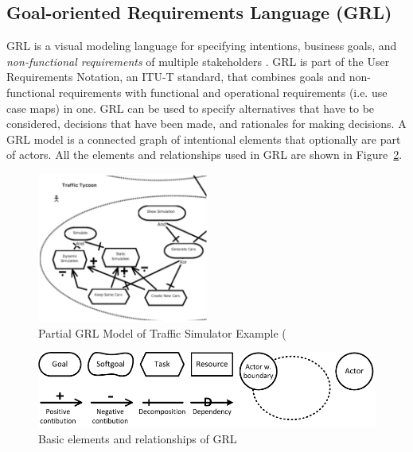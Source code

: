 \subsection{Goal-oriented Requirements Language (GRL)}
\label{sect:background:grl}
GRL is a visual modeling language for specifying intentions, business goals, and \emph{non-functional requirements} of multiple stakeholders \cite{Amyot:2010:EGM:1841349.1841356}. GRL is part of the User Requirements Notation, an ITU-T standard, that combines goals and non-functional requirements with functional and operational requirements (i.e. use case maps) in one. GRL can be used to specify alternatives that have to be considered, decisions that have been made, and rationales for making decisions. A GRL model is a connected graph of intentional elements that optionally are part of actors. All the elements and relationships used in GRL are shown in Figure~\ref{fig:grl_legend}.

\begin{figure}[ht]
\centering
\includegraphics[width=0.5\textwidth]{img/example_small}
\caption{Partial GRL Model of Traffic Simulator Example (}
\label{fig:example-small}
\end{figure}

\begin{figure}[ht]
\centering
\includegraphics[scale=0.6]{img/grl_legend}
\caption{Basic elements and relationships of GRL}
\label{fig:grl_legend}
\end{figure}

